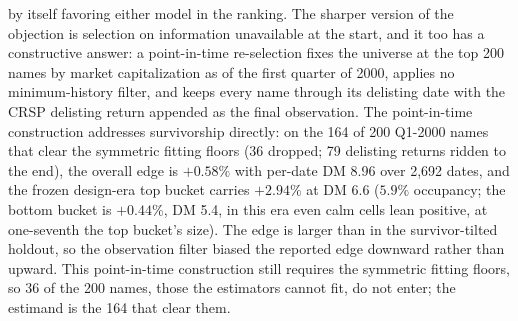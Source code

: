 \documentclass[11pt]{article}
\theoremstyle{remark}
\begin{document}
by itself favoring either model in the ranking. The sharper version
of the objection is selection on information unavailable at the
start, and it too has a constructive answer: a point-in-time
re-selection fixes the universe at the top 200 names by market
capitalization as of the first quarter of 2000, applies no
minimum-history filter, and keeps every name through its delisting
date with the CRSP delisting return appended as the final
observation.
The point-in-time construction addresses survivorship directly: on
the 164 of 200 Q1-2000 names that clear the symmetric fitting floors
(36 dropped; 79 delisting returns ridden to the end), the overall
edge is $+0.58\%$ with per-date DM 8.96 over 2{,}692 dates, and the
frozen design-era top bucket carries $+2.94\%$ at DM 6.6 ($5.9\%$
occupancy; the bottom bucket is $+0.44\%$, DM 5.4, in this era even calm cells lean positive, at one-seventh the top bucket's size).
The edge is larger than in the survivor-tilted holdout, so the
observation filter biased the reported edge downward rather than
upward. This point-in-time construction still requires the symmetric
fitting floors, so 36 of the 200 names, those the estimators cannot
fit, do not enter; the estimand is the 164 that clear them.
\end{document}
